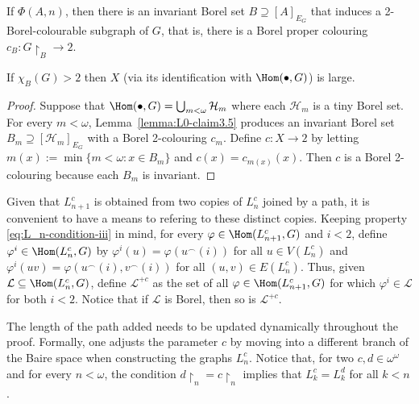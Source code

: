 \begin{lemma}\label{lemma:L0-claim3.5}
    If $\Phi(A,n)$, then there is an invariant Borel set $B\supseteq[A]_{E_G}$ that induces a 2-Borel-colourable subgraph of $G$, that is, there is a Borel proper colouring $c_B\colon G\restriction_B\to2$.
\end{lemma}

\begin{proposition}\label{prop:small}
    If $\chi_B(G)>2$ then $X$ (via its identification with $\Hom(\bullet,G)$) is large.
\end{proposition}

\begin{proof}
    Suppose that $\Hom(\bullet,G)=\bigcup_{m<\omega}\mathcal H_m$ where each $\mathcal H_m$ is a tiny Borel set.
    For every $m<\omega$, Lemma~\ref{lemma:L0-claim3.5} produces an invariant Borel set $B_m\supseteq[\mathcal H_m]_{E_G}$ with a Borel 2-colouring $c_m$.
    Define $c\colon X\to2$ by letting $m(x):=\min\{m<\omega:x\in B_m\}$ and $c(x)=c_{m(x)}(x)$.
    Then $c$ is a Borel 2-colouring because each $B_m$ is invariant.
\end{proof}

Given that $L^c_{n+1}$ is obtained from two copies of $L^c_n$ joined by a path, it is convenient to have a means to refering to these distinct copies.
Keeping property \eqref{eq:L_n-condition-iii} in mind, for every $\varphi\in\Hom(L^c_{n+1},G)$ and $i<2$, define $\varphi^i\in\Hom(L^c_n,G)$ by $\varphi^i(u)=\varphi(u^\frown (i))$ for all $u\in V(L^c_n)$ and $\varphi^i(uv)=\varphi(u^\frown(i),v^\frown(i))$ for all $(u,v)\in E(L^c_n)$.
Thus, given $\mathcal L\subseteq\Hom(L^c_n,G)$, define $\mathcal L^{+c}$ as the set of all $\varphi\in\Hom(L^c_{n+1},G)$ for which $\varphi^i\in\mathcal L$ for both $i<2$.
Notice that if $\mathcal L$ is Borel, then so is $\mathcal L^{+c}$.

The length of the path added needs to be updated dynamically throughout the proof.
Formally, one adjusts the parameter $c$ by moving into a different branch of the Baire space when constructing the graphs $L^c_n$.
Notice that, for two $c,d\in\omega^\omega$ and for every $n<\omega$, the condition $d\restriction_n=c\restriction_n$ implies that $L^c_k=L^d_k$ for all $k<n$.

